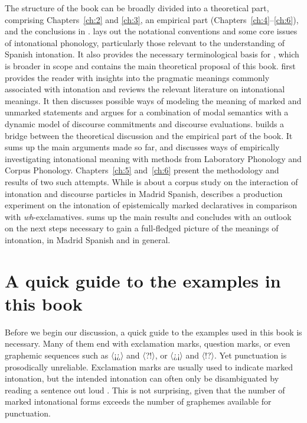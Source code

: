 The structure of the book can be broadly divided into a theoretical part, comprising Chapters~\ref{ch:2} and \ref{ch:3}, an empirical part (Chapters~\ref{ch:4}--\ref{ch:6}), and the conclusions in .   lays out the notational conventions and some core issues of intonational phonology, particularly those relevant to the understanding of Spanish intonation. It also provides the necessary terminological basis for , which is broader in scope and contains the main theoretical proposal of this book.  first provides the reader with insights into the pragmatic meanings commonly associated with intonation and reviews the relevant literature on intonational meanings. It then discusses possible ways of modeling the meaning of marked and unmarked statements and argues for a combination of modal semantics with a dynamic model of discourse commitments and discourse evaluations.  builds a bridge between the theoretical discussion and the empirical part of the book. It sums up the main arguments made so far, and discusses ways of empirically investigating intonational meaning with methods from Laboratory Phonology and Corpus Phonology. Chapters~\ref{ch:5} and~\ref{ch:6} present the methodology and results of two such attempts. While  is about a corpus study on the interaction of intonation and discourse particles in Madrid Spanish,  describes a production experiment on the intonation of epistemically marked declaratives in comparison with \textit{wh}-exclamatives.  sums up the main results and concludes with an outlook on the next steps necessary to gain a full-fledged picture of the meanings of intonation, in Madrid Spanish and in general.

\section{A quick guide to the examples in this book}\label{ch:guide}

Before we begin our discussion, a quick guide to the examples used in this book is necessary. Many of them end with exclamation marks, question marks, or even graphemic sequences such as 〈¡¿〉 and 〈?!〉, or 〈¿¡〉 and 〈!?〉. Yet punctuation is prosodically unreliable. Exclamation marks are usually used to indicate marked intonation, but the intended intonation can often only be disambiguated by reading a sentence out loud \citep{RealAcademiaEspanola.2010}. This is not surprising, given that the number of marked intonational forms exceeds the number of graphemes available for punctuation.

